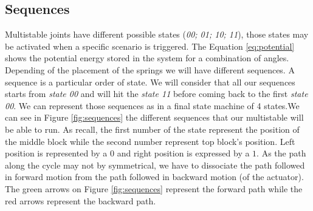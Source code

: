     \subsection{Sequences}\label{sec:sequences}
        Multistable joints have different possible states (\textit{00; 01; 10; 11}), those states may be activated when a specific scenario is triggered. The Equation \ref{eq:potential} shows the potential energy stored in the system for a combination of angles. Depending of the placement of the springs we will have different sequences. A sequence is a particular order of state. We will consider that all our sequences starts from \textit{state 00} and will hit the \textit{state 11} before coming back to the first \textit{state 00}. We can represent those sequences as in a final state machine of 4 states.We can see in Figure \ref{fig:sequences} the different sequences that our multistable will be able to run. As recall, the first number of the state represent the position of the middle block while the second number represent top block's position. Left position is represented by a $0$ and right position is expressed by a $1$. As the path along the cycle may not by symmetrical, we have to dissociate the path followed in forward motion from the path followed in backward motion (of the actuator). The green arrows on Figure \ref{fig:sequences} represent the forward path while the red arrows represent the backward path. \\
        
